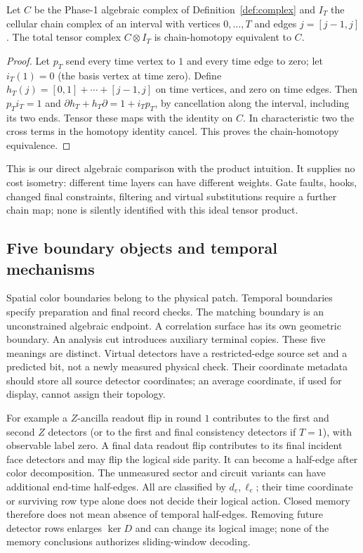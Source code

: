 \begin{proposition}\label{prop:cl-product}
Let $C$ be the Phase-1 algebraic complex of Definition~\ref{def:complex}
and $I_T$ the cellular chain complex of an interval with vertices
$0,\ldots,T$ and edges $j=[j-1,j]$. The total tensor complex
$C\otimes I_T$ is chain-homotopy equivalent to $C$.
\end{proposition}
\begin{proof}
Let $p_T$ send every time vertex to $1$ and every time edge to zero;
let $i_T(1)=0$ (the basis vertex at time zero). Define
$h_T(j)=[0,1]+\cdots+[j-1,j]$ on time vertices, and zero on time edges.
Then $p_Ti_T=1$ and $\partial h_T+h_T\partial=1+i_Tp_T$, by cancellation
along the interval, including its two ends. Tensor these maps with the
identity on $C$. In characteristic two the cross terms in the homotopy
identity cancel. This proves the chain-homotopy equivalence.
\end{proof}
This is our direct algebraic comparison with the product intuition.
It supplies no cost isometry: different time layers can have different
weights. Gate faults, hooks, changed final constraints, filtering and
virtual substitutions require a further chain map; none is silently
identified with this ideal tensor product.

\subsection{Five boundary objects and temporal mechanisms}
Spatial color boundaries belong to the physical patch. Temporal boundaries
specify preparation and final record checks. The matching boundary is an
unconstrained algebraic endpoint. A correlation surface has its own
geometric boundary. An analysis cut introduces auxiliary terminal copies.
These five meanings are distinct. Virtual detectors have a restricted-edge
source set and a predicted bit, not a newly measured physical check.
Their coordinate metadata should store all source detector coordinates;
an average coordinate, if used for display, cannot assign their topology.

For example a $Z$-ancilla readout flip in round $1$ contributes to the
first and second $Z$ detectors (or to the first and final consistency
detectors if $T=1$), with observable label zero. A final data readout flip
contributes to its final incident face detectors and may flip the logical
side parity. It can become a half-edge after color decomposition.
The unmeasured sector and circuit variants can have additional end-time
half-edges. All are classified by $d_e,\ell_e$; their time coordinate or
surviving row type alone does not decide their logical action.
Closed memory therefore does not mean absence of temporal half-edges.
Removing future detector rows enlarges $\ker D$ and can change its logical
image; none of the memory conclusions authorizes sliding-window decoding.

